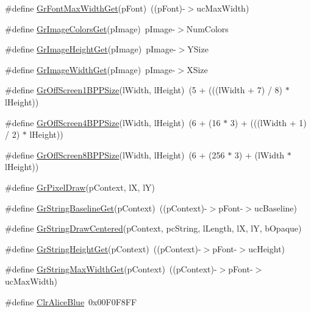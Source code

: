 \begin{DoxyCompactItemize}
\#define \hyperlink{group__primitives__api_ga776450fb4470ee3c6679549d4f9772e3}{Gr\+Font\+Max\+Width\+Get}(p\+Font)~((p\+Font)-\/$>$uc\+Max\+Width)
\item 
\#define \hyperlink{group__primitives__api_gae64e1f422a10d1f6e778fa11feccb72b}{Gr\+Image\+Colors\+Get}(p\+Image)~p\+Image-\/$>$Num\+Colors
\item 
\#define \hyperlink{group__primitives__api_ga99e8800d6f4ad9a948cca8f8b5466d06}{Gr\+Image\+Height\+Get}(p\+Image)~p\+Image-\/$>$Y\+Size
\item 
\#define \hyperlink{group__primitives__api_gac5a818909f750ccef4de5b91e51b6bfb}{Gr\+Image\+Width\+Get}(p\+Image)~p\+Image-\/$>$X\+Size
\item 
\#define \hyperlink{group__primitives__api_gaaa796903bb03f6061dcd78226e2e5845}{Gr\+Off\+Screen1\+B\+P\+P\+Size}(l\+Width,  l\+Height)~(5 + (((l\+Width + 7) / 8) $\ast$ l\+Height))
\item 
\#define \hyperlink{group__primitives__api_ga9cec5735b48b66f596f323c01548bfec}{Gr\+Off\+Screen4\+B\+P\+P\+Size}(l\+Width,  l\+Height)~(6 + (16 $\ast$ 3) + (((l\+Width + 1) / 2) $\ast$ l\+Height))
\item 
\#define \hyperlink{group__primitives__api_ga7fac7401d41cd5fa18c98d209f0dad97}{Gr\+Off\+Screen8\+B\+P\+P\+Size}(l\+Width,  l\+Height)~(6 + (256 $\ast$ 3) + (l\+Width $\ast$ l\+Height))
\item 
\#define \hyperlink{group__primitives__api_gaec66cc4130bb7454a14080d6fed5c2c8}{Gr\+Pixel\+Draw}(p\+Context,  l\+X,  l\+Y)
\item 
\#define \hyperlink{group__primitives__api_ga1a557c1a7517cdc1e61e5728ee3969ff}{Gr\+String\+Baseline\+Get}(p\+Context)~((p\+Context)-\/$>$p\+Font-\/$>$uc\+Baseline)
\item 
\#define \hyperlink{group__primitives__api_ga4ab68eecbbfcca392b8d4642b681d912}{Gr\+String\+Draw\+Centered}(p\+Context,  pc\+String,  l\+Length,  l\+X,  l\+Y,  b\+Opaque)
\item 
\#define \hyperlink{group__primitives__api_ga258ddad68eadf9d1c03d1c0a97d3e215}{Gr\+String\+Height\+Get}(p\+Context)~((p\+Context)-\/$>$p\+Font-\/$>$uc\+Height)
\item 
\#define \hyperlink{group__primitives__api_gaca6b9b536d4b4584561e132de35db9f2}{Gr\+String\+Max\+Width\+Get}(p\+Context)~((p\+Context)-\/$>$p\+Font-\/$>$uc\+Max\+Width)
\item 
\#define \hyperlink{group__primitives__api_ga2b3c9de1a7707fe905767d241db6ac77}{Clr\+Alice\+Blue}~0x00\+F0\+F8\+F\+F
\item 

\end{DoxyCompactItemize}
